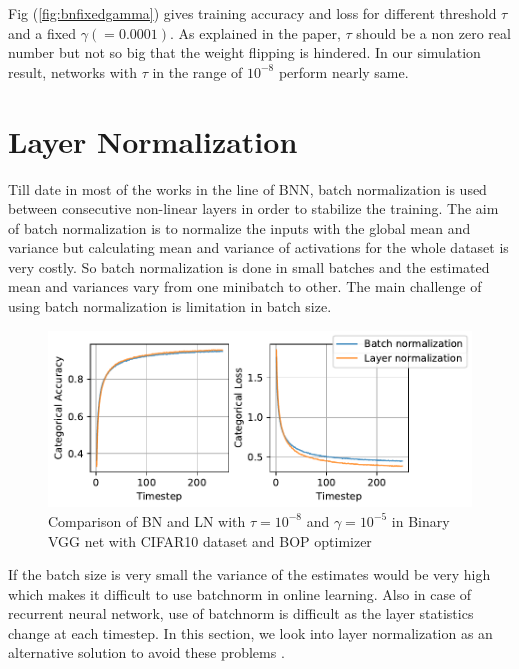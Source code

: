 Fig (\ref{fig:bnfixedgamma}) gives training accuracy and loss for different threshold $\tau$ and a fixed $\gamma(=0.0001)$. As explained in the paper, $\tau$ should be a non zero real number but not so big that the weight flipping is hindered. In our simulation result, networks with $\tau$ in the range of $10^{-8}$ perform nearly same. 



\section{Layer Normalization}
Till date in most of the works in the line of BNN, batch normalization is used between consecutive non-linear layers in order to stabilize the training. The aim of batch normalization is to normalize the inputs with the global mean and variance but calculating mean and variance of activations for the whole dataset is very costly. So batch normalization is done in small batches and the estimated mean and variances vary from one minibatch to other. The main challenge of using batch normalization is limitation in batch size.
\begin{figure}[!ht]
    \centering
    \includegraphics[scale=0.8]{fig/AccuracyLosscompareBNLN.pdf}
    \caption{Comparison of BN and LN with $\tau=10^{-8}$ and $\gamma=10^{-5}$ in Binary VGG net with CIFAR10 dataset and BOP optimizer}
    \label{fig:bnln}
\end{figure}
If the batch size is very small the variance of the estimates would be very high which makes it difficult to use batchnorm in online learning. Also in case of recurrent neural network, use of batchnorm is difficult as the layer statistics change at each timestep. In this section, we look into layer normalization as an alternative solution to avoid these problems \cite{lei2016layer}. 

